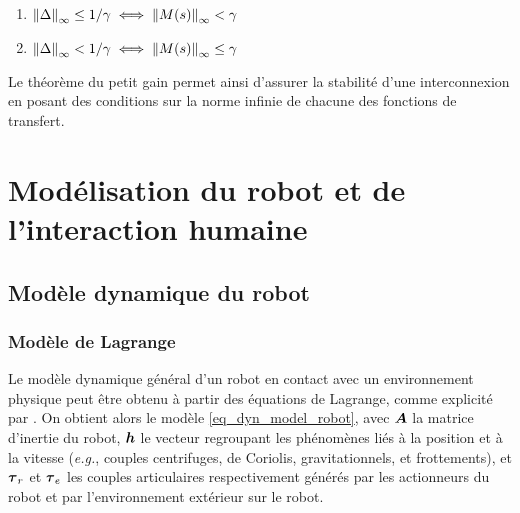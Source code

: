 \begin{minipage}{.4\linewidth}
	\centering
	\begin{enumerate}
		\item $\left\lVert\Delta\right\rVert_\infty \leq 1/\gamma \iff \left\lVert M(s)\right\rVert_\infty < \gamma$
		\item $\left\lVert\Delta\right\rVert_\infty < 1/\gamma \iff \left\lVert M(s)\right\rVert_\infty \leq \gamma$
	\end{enumerate}
\end{minipage}
\hfill
\begin{minipage}{.6\linewidth}
	\centering
	
\end{minipage}

\vspace{2mm}
Le théorème du petit gain permet ainsi d'assurer la stabilité d'une interconnexion en posant des conditions sur la norme infinie de chacune des fonctions de transfert.


\section{Modélisation du robot et de l'interaction humaine} \label{chap5_sec_model}

\subsection{Modèle dynamique du robot} \label{chap5_sec_model_sub_robot_dynamic}

\subsubsection{Modèle de Lagrange} \label{chap5_sec_model_sub_robot_dynamic_1}

Le modèle dynamique général d'un robot en contact avec un environnement physique peut être obtenu à partir des équations de Lagrange, comme explicité par \textcite[Chapitre~9]{khalil_modeling_2002}. On obtient alors le modèle \cref{eq_dyn_model_robot}, avec $ \matr{A} $ la matrice d'inertie du robot, $ \vect{h} $ le vecteur regroupant les phénomènes liés à la position et à la vitesse (\textit{e.g.}, couples centrifuges, de Coriolis, gravitationnels, et frottements), et $ \vect{\tau}_r $ et $ \vect{\tau}_{e} $ les couples articulaires respectivement générés par les actionneurs du robot et par l'environnement extérieur sur le robot.


